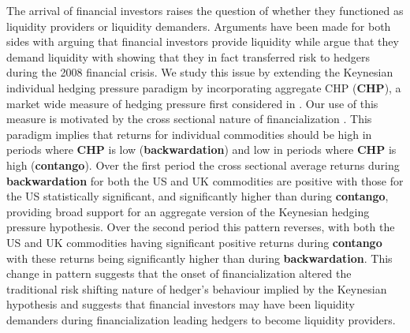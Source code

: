 \documentclass[12pt,]{article}
\begin{document}
The arrival of financial investors raises the question of whether they
functioned as liquidity providers or liquidity demanders. Arguments have
been made for both sides with \citet{moskowitz_time_2012} arguing that
financial investors provide liquidity while
\citet{Kangtaletwopremiums2017} argue that they demand liquidity with
\citet{cheng_convective_2014} showing that they in fact transferred risk
to hedgers during the 2008 financial crisis. We study this issue by
extending the Keynesian individual hedging pressure paradigm by
incorporating aggregate CHP (\textbf{CHP}), a market wide measure of
hedging pressure first considered in \citet{hong_what_2012}. Our use of
this measure is motivated by the cross sectional nature of
financialization
\citep{basak_model_2016, cheng_convective_2014, le_futures_2017}. This
paradigm implies that returns for individual commodities should be high
in periods where \textbf{CHP} is low (\textbf{backwardation}) and low in
periods where \textbf{CHP} is high (\textbf{contango}). Over the first
period the cross sectional average returns during \textbf{backwardation}
for both the US and UK commodities are positive with those for the US
statistically significant, and significantly higher than during
\textbf{contango}, providing broad support for an aggregate version of
the Keynesian hedging pressure hypothesis. Over the second period this
pattern reverses, with both the US and UK commodities having significant
positive returns during \textbf{contango} with these returns being
significantly higher than during \textbf{backwardation}. This change in
pattern suggests that the onset of financialization altered the
traditional risk shifting nature of hedger's behaviour implied by the
Keynesian hypothesis and suggests that financial investors may have been
liquidity demanders during financialization leading hedgers to become
liquidity providers.
\end{document}
